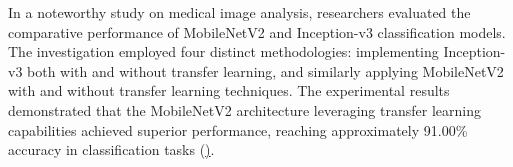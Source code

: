 \documentclass[a4paper,12pt]{article}
\begin{document}


In a noteworthy study on medical image analysis, researchers evaluated the comparative performance of MobileNetV2 and Inception-v3 classification models. The investigation employed four distinct methodologies: implementing Inception-v3 both with and without transfer learning, and similarly applying MobileNetV2 with and without transfer learning techniques. The experimental results demonstrated that the MobileNetV2 architecture leveraging transfer learning capabilities achieved superior performance, reaching approximately 91.00\% accuracy in classification tasks (\href{https://thesai.org/Publications/ViewPaper?Volume=11&Issue=8&Code=IJACSA&SerialNo=40}). 

\end{document}
